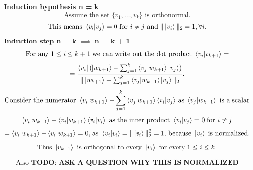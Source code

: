 \documentclass{article}
\begin{document}
\begin{framed}
    \textbf{Induction hypothesis n = k}
    \begin{equation*}
        \text{Assume the set } \{v_1, \dots, v_k\} \text{ is orthonormal.}
    \end{equation*}
    \begin{equation*}
        \text{This means } \braket{v_i | v_j } = 0 \text{ for } i \neq j \text{ and } \|\ket{v_i}\|_2 = 1, \forall i.
    \end{equation*}
    \textbf{Induction step n = k } $\implies$ \textbf{ n = k + 1}
    \begin{equation*}
        \text{For any } 1 \leq i \leq k + 1 \text{ we can write out the dot product } \braket{v_i | v_{k+1}} =
    \end{equation*}
    \begin{equation*}
        = \frac{\bra{v_i}(\ket{w_{k+1}} - \sum_{j=1}^{k}{\braket{v_j | w_{k+1}}}\ket{v_j})}{\|\ket{w_{k+1}} - \sum_{j=1}^{k}{\braket{v_j | w_{k+1}}}\ket{v_j}\|_2}.
    \end{equation*}
    \begin{equation*}
        \text{Consider the numerator } \braket{v_i | w_{k+1}} - \sum_{j=1}^{k}{\braket{v_j | w_{k+1}}\braket{v_i | v_j}} \text{ as } \braket{v_j | w_{k+1}} \text{ is a scalar}
    \end{equation*}
    \begin{equation*}
        \braket{v_i | w_{k+1}} - \braket{v_i | w_{k+1}}\braket{v_i | v_i} \text{ as the inner product } \braket{v_i | v_j } = 0 \text{ for } i \neq j
    \end{equation*}
    \begin{equation*}
        = \braket{v_i | w_{k+1}} - \braket{v_i | w_{k+1}} = 0 \text{, as } \braket{v_i | v_i} = \|\ket{v_i}\|_2^{2} = 1 \text{, because } \ket{v_i} \text{ is normalized}.
    \end{equation*}
    \begin{equation*}
        \text{Thus } \ket{v_{k+1}} \text{ is orthogonal to every } \ket{v_i} \text{ for every } 1 \leq i \leq k.
    \end{equation*}

    \begin{equation*}
        \text{Also } \textbf{TODO: ASK A QUESTION WHY THIS IS NORMALIZED}
    \end{equation*}
\end{framed}

\bigskip
\end{document}

